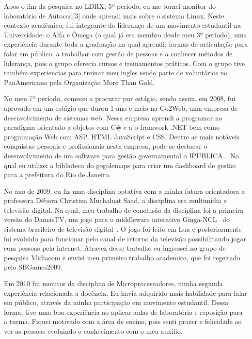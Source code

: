 \documentclass[10pt,a4paper,oneside]{book}
\begin{document}
Apos o fim da pesquisa no LDRX, 5º período, eu me tornei monitor do laboratório de Autocad[3] 
onde aprendi mais sobre o sistema Linux. Neste contexto acadêmico, fui integrante da liderança de um  
movimento estudantil na Universidade: o Alfa e Ômega (o qual já era membro desde meu 3º período), 
uma experiência durante toda a graduação na qual aprendi:  formas de articulação para falar em público, 
a trabalhar com gestão de pessoas e a conhecer métodos de liderança, pois o grupo oferecia cursos e treinamentos práticos.  
Com o grupo tive também experiencias para treinar meu ingles sendo parte de voluntários no PanAmericano pela
Organização More Than Gold.

No meu 7º período, comecei a procurar por estágio, sendo assim, em 2008, fui aprovado em um estágio 
que durou 1 ano e meio na Go2Web, uma empresa de desenvolvimento de sistemas web. Nessa
empresa aprendi a programar no paradigma orientado a objetos com C\# e a o framwork .NET bem como 
programação Web com ASP, HTML JavaScript e CSS.
Dentre as mais notáveis conquistas pessoais e profissionais nesta empresa, pode-se destacar o 
desenvolvimento de um software para gestão governamental o IPUBLICA~\cite{ipu_sistema_gestao}.
No qual eu utilizei a biblioteca do gogolemaps para criar um dashboard de gestão para a prefeitura 
do Rio de Janeiro.

No ano de 2009, eu fiz uma disciplina optativa com a minha futura orientadora a professora 
Débora Christina Muchaluat Saad, a disciplina era multimídia e televisão digital. Na qual,
meu trabalho de conclusão da disciplina foi a primeira versão do DamasTV, um jogo para o middleware 
interativo Ginga-NCL~\cite{soares2007ginga} do sistema brasileiro de televisão digital~\cite{mendes2007sbtvd}. 
O jogo foi feito em Lua e posteriormente foi evoluido para funcionar pelo canal de retorno da televisão
possibilitando jogar com pessoas pela internet.
Atravez desse trabalho eu ingressei no grupo de pesquisa Midiacom e enviei meu primeiro trabalho academico,
que foi regeitado pelo SBGames2009.

Em 2010 fui monitor da disciplina de Microprocessadores,  minha segunda experiência 
relacionada a docência. Eu havia adquirido mais habilidade para falar em público, através da minha 
participação em movimento estudantil. Dessa forma,  tive uma boa experiência ao aplicar aulas de 
laboratório e reposição para a turma. Fiquei motivado com a área de ensino, pois senti prazer e 
felicidade ao ver as pessoas evoluindo o conhecimento com o meu auxilio. 
\end{document}
